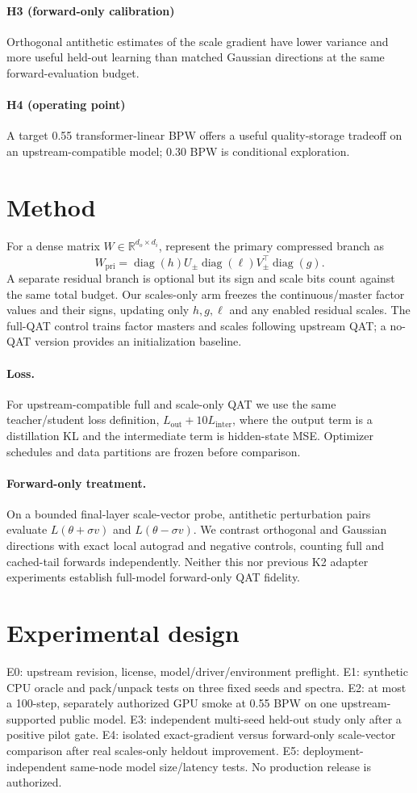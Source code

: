 \documentclass[11pt]{article}
\begin{document}
\paragraph{H3 (forward-only calibration)} Orthogonal antithetic estimates of the scale gradient have lower variance and more useful held-out learning than matched Gaussian directions at the same forward-evaluation budget.
\paragraph{H4 (operating point)} A target 0.55 transformer-linear BPW offers a useful quality-storage tradeoff on an upstream-compatible model; 0.30 BPW is conditional exploration.
\section{Method}
For a dense matrix $W\in\mathbb{R}^{d_o\times d_i}$, represent the primary compressed branch as
\[
\widehat W_{\mathrm{pri}}=\operatorname{diag}(h) U_{\pm}\operatorname{diag}(\ell)V_{\pm}^{\top}\operatorname{diag}(g).
\]
A separate residual branch is optional but its sign and scale bits count against the same total budget. Our scales-only arm freezes the continuous/master factor values and their signs, updating only $h,g,\ell$ and any enabled residual scales. The full-QAT control trains factor masters and scales following upstream QAT; a no-QAT version provides an initialization baseline.
\paragraph{Loss.} For upstream-compatible full and scale-only QAT we use the same teacher/student loss definition, $L_{\mathrm{out}}+10 L_{\mathrm{inter}}$, where the output term is a distillation KL and the intermediate term is hidden-state MSE. Optimizer schedules and data partitions are frozen before comparison.
\paragraph{Forward-only treatment.} On a bounded final-layer scale-vector probe, antithetic perturbation pairs evaluate $L(\theta+\sigma v)$ and $L(\theta-\sigma v)$. We contrast orthogonal and Gaussian directions with exact local autograd and negative controls, counting full and cached-tail forwards independently. Neither this nor previous K2 adapter experiments establish full-model forward-only QAT fidelity.
\section{Experimental design}
E0: upstream revision, license, model/driver/environment preflight. E1: synthetic CPU oracle and pack/unpack tests on three fixed seeds and spectra. E2: at most a 100-step, separately authorized GPU smoke at 0.55 BPW on one upstream-supported public model. E3: independent multi-seed held-out study only after a positive pilot gate. E4: isolated exact-gradient versus forward-only scale-vector comparison after real scales-only heldout improvement. E5: deployment-independent same-node model size/latency tests. No production release is authorized.
\end{document}
